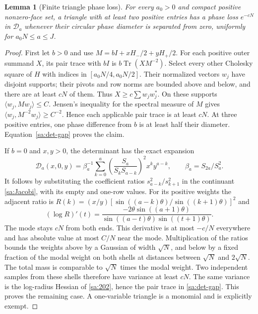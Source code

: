 \documentclass[11pt]{article}
\numberwithin{equation}{section}
\newtheorem{lemma}[theorem]{Lemma}
\theoremstyle{definition}\newtheorem{definition}[theorem]{Definition}
\theoremstyle{remark}\newtheorem{remark}[theorem]{Remark}
\begin{document}
\begin{lemma}[Finite triangle phase loss]\label{sa:triangle-gap}
For every $a_0>0$ and compact positive nonzero-face set, a triangle
with at least two positive entries has a phase loss $e^{-cN}$ in
$\mathcal D_a$ whenever their circular phase diameter is separated
from zero, uniformly for $a_0N\le a\le J$.
\end{lemma}
\begin{proof}
First let $b>0$ and use $M=bI+xH_-/2+yH_+/2$. For each positive
outer summand $X$, its pair trace with $bI$ is
$b\operatorname{Tr}(XM^{-2})$. Select every other Cholesky square
of $H$ with indices in $[a_0N/4,a_0N/2]$. Their normalized vectors
$w_j$ have disjoint supports; their pivots and row norms are bounded
above and below, and there are at least $cN$ of them. Thus
$X\ge c\sum w_jw_j^*$. On these supports
$\langle w_j,Mw_j\rangle\le C$. Jensen's inequality for the spectral
measure of $M$ gives
$\langle w_j,M^{-2}w_j\rangle\ge C^{-2}$.
Hence each applicable pair trace is at least $cN$.
At three positive entries, one phase difference from $b$ is at
least half their diameter. Equation~\eqref{sa:det-gap} proves the claim.

If $b=0$ and $x,y>0$, the determinant has the exact expansion
\begin{equation}\label{sa:202}
 \mathcal D_a(x,0,y)=\beta_a^{-1}
       \sum_{k=0}^a\left(\frac{S_a}{S_kS_{a-k}}\right)^2x^ky^{a-k},
                   \qquad\beta_a=S_{2a}/S_a^2.
\end{equation}
It follows by substituting the coefficient ratios
$s_{a-k}^2/s_{k+1}^2$ in the continuant
\eqref{sa:Jacobi}, with its empty and one-row values.
For its positive weights the adjacent ratio is
$R(k)=(x/y)[\sin((a-k)\theta)/\sin((k+1)\theta)]^2$ and
\[
 (\log R)'(t)=
 \frac{-2\theta\sin((a+1)\theta)}
        {\sin((a-t)\theta)\sin((t+1)\theta)}.
\]
The mode stays $cN$ from both ends. This derivative is at most
$-c/N$ everywhere and has absolute value at most $C/N$ near the mode.
Multiplication of the ratios bounds the weights above by a Gaussian
of width $\sqrt N$, and below by a fixed fraction of the modal weight
on both shells at distances between $\sqrt N$ and $2\sqrt N$.
The total mass is comparable to $\sqrt N$ times the modal weight.
Two independent samples from these shells therefore have variance
at least $cN$. The same variance is the log-radius Hessian of
\eqref{sa:202}, hence the pair trace in \eqref{sa:det-gap}.
This proves the remaining case. A one-variable triangle is a monomial
and is explicitly exempt.
\end{proof}
\end{document}
